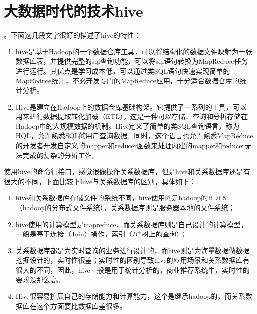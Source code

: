 \section{大数据时代的技术hive}
。下面这几段文字很好的描述了hive的特性：
\begin{enumerate}[(1)]
\item hive是基于Hadoop的一个数据仓库工具，可以将结构化的数据文件映射为一张数据库表，并提供完整的sql查询功能，可以将sql语句转换为MapReduce任务进行运行。其优点是学习成本低，可以通过类SQL语句快速实现简单的MapReduce统计，不必开发专门的MapReduce应用，十分适合数据仓库的统计分析。
\item Hive是建立在Hadoop上的数据仓库基础构架。它提供了一系列的工具，可以用来进行数据提取转化加载（ETL），这是一种可以存储、查询和分析存储在Hadoop中的大规模数据的机制。Hive定义了简单的类SQL查询语言，称为HQL，允许熟悉SQL的用户查询数据。同时，这个语言也允许熟悉MapReduce的开发者开发自定义的mapper和reducer函数来处理内建的mapper和reducer无法完成的复杂的分析工作。
\end{enumerate}
\par 使用hive的命令行接口，感觉很像操作关系数据库，但是hive和关系数据库还是有很大的不同，下面比较下hive与关系数据库的区别，具体如下：
\begin{enumerate}[(1)]
\item hive和关系数据库存储文件的系统不同，hive使用的是hadoop的HDFS（hadoop的分布式文件系统），关系数据库则是服务器本地的文件系统；
\item hive使用的计算模型是mapreduce，而关系数据库则是自己设计的计算模型，一般是基于连接（Join）操作，索引（$B^+$树上的查询）；
\item 关系数据库都是为实时查询的业务进行设计的，而hive则是为海量数据做数据挖掘设计的，实时性很差；实时性的区别导致hive的应用场景和关系数据库有很大的不同，因此，hive一般是用于统计分析的，商业推荐系统中，实时性的要求没那么高。
\item Hive很容易扩展自己的存储能力和计算能力，这个是继承hadoop的，而关系数据库在这个方面要比数据库差很多。
\end{enumerate}
